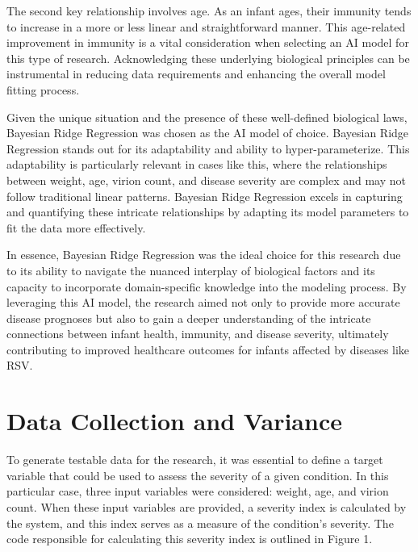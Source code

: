 \documentclass{article}
\begin{document}
The second key relationship involves age. As an infant ages, their immunity tends
to increase in a more or less linear and straightforward manner. This age-related
improvement in immunity is a vital consideration when selecting an AI model for this
type of research. Acknowledging these underlying biological principles can be
instrumental in reducing data requirements and enhancing the overall model fitting
process.

Given the unique situation and the presence of these well-defined biological laws,
Bayesian Ridge Regression was chosen as the AI model of choice. Bayesian Ridge
Regression stands out for its adaptability and ability to hyper-parameterize. This
adaptability is particularly relevant in cases like this, where the relationships between
weight, age, virion count, and disease severity are complex and may not follow
traditional linear patterns. Bayesian Ridge Regression excels in capturing and quantifying
these intricate relationships by adapting its model parameters to fit the data more
effectively.

In essence, Bayesian Ridge Regression was the ideal choice for this research due
to its ability to navigate the nuanced interplay of biological factors and its capacity to
incorporate domain-specific knowledge into the modeling process. By leveraging this AI
model, the research aimed not only to provide more accurate disease prognoses but also
to gain a deeper understanding of the intricate connections between infant health,
immunity, and disease severity, ultimately contributing to improved healthcare outcomes
for infants affected by diseases like RSV.



\section{Data Collection and Variance}
To generate testable data for the research, it was essential to define a target
variable that could be used to assess the severity of a given condition. In this particular
case, three input variables were considered: weight, age, and virion count. When these
input variables are provided, a severity index is calculated by the system, and this index
serves as a measure of the condition's severity. The code responsible for calculating this
severity index is outlined in Figure 1.
\end{document}
